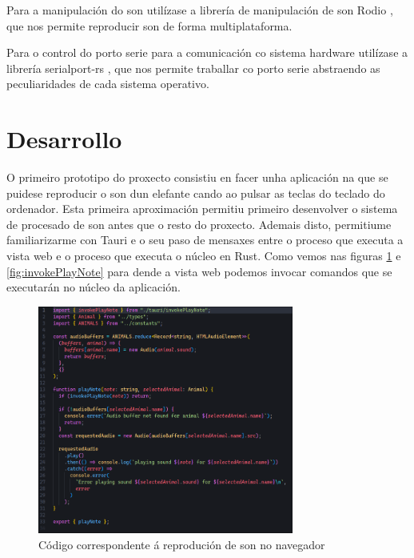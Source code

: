 Para a manipulación do son utilízase a librería de manipulación de son Rodio \cite{Rodio}, que nos permite reproducir son de forma multiplataforma.

Para o control do porto serie para a comunicación co sistema hardware utilízase a librería serialport-rs \cite{Serialport}, que nos permite traballar co porto serie abstraendo as peculiaridades de cada sistema operativo. 


\section{Desarrollo}


O primeiro prototipo do proxecto consistiu en facer unha aplicación na que se puidese reproducir o son dun elefante cando ao pulsar as teclas do teclado do ordenador. Esta primeira aproximación permitiu primeiro desenvolver o sistema de procesado de son antes que o resto do proxecto. Ademais disto, permitiume familiarizarme con Tauri e o seu paso de mensaxes entre o proceso que executa a vista web e o proceso que executa o núcleo en Rust. Como vemos nas figuras \ref{fig:playNote} e \ref{fig:invokePlayNote} para dende a vista web podemos invocar comandos que se executarán no núcleo da aplicación. 

\begin{figure}[hp!]
  \centering
  \includegraphics[width=0.75\textwidth]{imaxes/playNote.png}
  \caption{Código correspondente á reprodución de son no navegador}
  \label{fig:playNote}
\end{figure}

